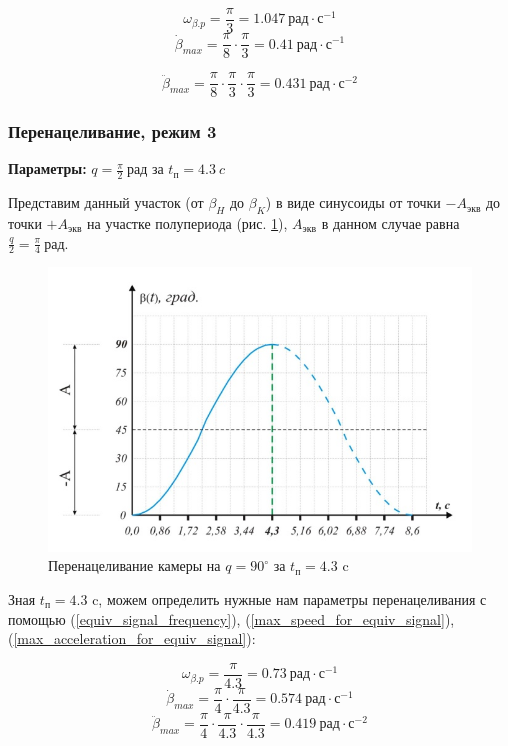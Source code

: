 $$
    \omega_{\beta.p} = \frac{\pi}{3} = 1.047 ~\textit{рад} \cdot \textit{с}^{-1}
$$
$$
    \dot{\beta}_{max} = \frac{\pi}{8} \cdot \frac{\pi}{3} = 0.41 ~\textit{рад} \cdot \textit{с}^{-1}
$$

$$
    \ddot{\beta}_{max} = \frac{\pi}{8} \cdot \frac{\pi}{3} \cdot \frac{\pi}{3} = 0.431 ~\textit{рад} \cdot \textit{с}^{-2}
$$

\subsubsection{Перенацеливание, режим 3}

\textbf{Параметры:} $q = \frac{\pi}{2} ~\textit{рад}$ за $t_\textit{п} = 4.3 ~\textit{c}$

Представим данный участок (от $\beta_{H}$ до $\beta_{K}$) в виде синусоиды от точки
$-A_\textit{экв}$ до точки $+A_\textit{экв}$ на участке полупериода
(рис. \ref{retarget_90grad_4,3sec}), $A_\textit{экв}$ в данном случае
равна $\frac{q}{2} = \frac{\pi}{4} ~\textit{рад}$.

\begin{figure}[ht!]
    \centering
    \includegraphics[keepaspectratio]{./src/pictures/retarget_equivalent_input_signals/90grad_4,3sec}
    \caption{Перенацеливание камеры на $q = 90^{\circ}$ за $t_\textit{п} = 4.3$ c}
    \label{retarget_90grad_4,3sec}
\end{figure}

Зная $t_{\textit{п} } = 4.3$ c, можем определить нужные нам параметры перенацеливания
с помощью (\ref{equiv_signal_frequency}),
(\ref{max_speed_for_equiv_signal}),
(\ref{max_acceleration_for_equiv_signal}):

$$
    \omega_{\beta.p} = \frac{\pi}{4.3} = 0.73 ~\textit{рад} \cdot \textit{с}^{-1}
$$
$$
    \dot{\beta}_{max} = \frac{\pi}{4} \cdot \frac{\pi}{4.3} = 0.574 ~\textit{рад} \cdot \textit{с}^{-1}
$$
$$
    \ddot{\beta}_{max} = \frac{\pi}{4} \cdot \frac{\pi}{4.3} \cdot \frac{\pi}{4.3} = 0.419 ~\textit{рад} \cdot \textit{с}^{-2}
$$

\endinput
